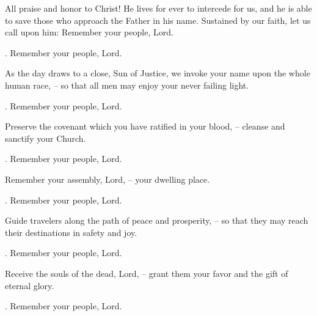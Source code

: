\lettrine[loversize=0.15,lines=2]{A}{}ll praise and honor to Christ! He lives for ever to intercede for us, and he is able to save those who approach the Father in his name. Sustained by our faith, let us call upon him:
Remember your people, Lord.

\par \Rbar. Remember your people, Lord.

As the day draws to a close, Sun of Justice, we invoke your name upon the whole human race,
– so that all men may enjoy your never failing light.

\par \Rbar. Remember your people, Lord.

Preserve the covenant which you have ratified in your blood,
– cleanse and sanctify your Church.
\par \Rbar. Remember your people, Lord.

Remember your assembly, Lord,
– your dwelling place.
\par \Rbar. Remember your people, Lord.

Guide travelers along the path of peace and prosperity,
– so that they may reach their destinations in safety and joy.
\par \Rbar. Remember your people, Lord.

Receive the souls of the dead, Lord,
– grant them your favor and the gift of eternal glory.
\par \Rbar. Remember your people, Lord.
